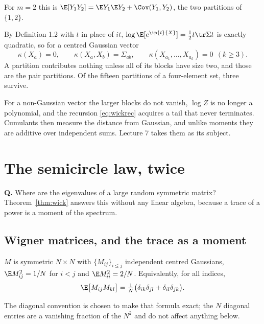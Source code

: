 \documentclass[11pt]{article}
\begin{document}
For $m=2$ this is $\E[Y_1Y_2]=\E Y_1\E Y_2+\Cov(Y_1,Y_2)$, the two partitions of $\{1,2\}$.

By Definition 1.2 with $t$ in place of $it$, $\log\E[e^{\ip{t}{X}}]=\tfrac12t\tr\Sigma t$ is exactly quadratic, so for a centred Gaussian vector
\[
\kappa(X_a)=0,\qquad \kappa(X_a,X_b)=\Sigma_{ab},\qquad \kappa(X_{a_1},\dots,X_{a_k})=0\ \ (k\ge3).
\]
A partition contributes nothing unless all of its blocks have size two, and those are the pair partitions. Of the fifteen partitions of a four-element set, three survive.

\begin{remark}\label{rem:cumulant}
For a non-Gaussian vector the larger blocks do not vanish, $\log Z$ is no longer a polynomial, and the recursion \eqref{eq:wickrec} acquires a tail that never terminates. Cumulants then measure the distance from Gaussian, and unlike moments they are additive over independent sums. Lecture 7 takes them as its subject.
\end{remark}

\section{The semicircle law, twice}

\begin{question}
\textbf{Q.} Where are the eigenvalues of a large random symmetric matrix?\\[0.25em]
Theorem~\ref{thm:wick} answers this without any linear algebra, because a trace of a power is a moment of the spectrum.
\end{question}

\subsection{Wigner matrices, and the trace as a moment}

\begin{definition}\label{def:wigner}
$M$ is symmetric $N\times N$ with $\{M_{ij}\}_{i\le j}$ independent centred Gaussians, $\E M_{ij}^2=1/N$ for $i<j$ and $\E M_{ii}^2=2/N$. Equivalently, for all indices,
\[
\E\big[M_{ij}M_{kl}\big]=\tfrac1N\big(\delta_{ik}\delta_{jl}+\delta_{il}\delta_{jk}\big).
\]
\end{definition}

The diagonal convention is chosen to make that formula exact; the $N$ diagonal entries are a vanishing fraction of the $N^2$ and do not affect anything below.
\end{document}
